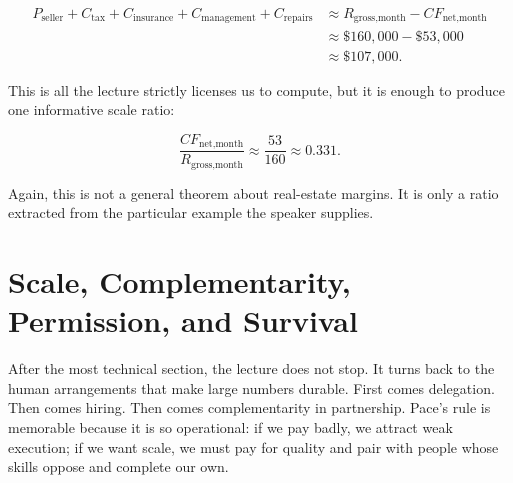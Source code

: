 \begin{align}
P_{\text{seller}}+C_{\text{tax}}+C_{\text{insurance}}+C_{\text{management}}+C_{\text{repairs}}
&\approx R_{\text{gross,month}}-CF_{\text{net,month}}\\
&\approx \$160{,}000-\$53{,}000\\
&\approx \$107{,}000.
\end{align}

This is all the lecture strictly licenses us to compute, but it is enough to produce one informative scale ratio:

\begin{equation}
\frac{CF_{\text{net,month}}}{R_{\text{gross,month}}}
\approx
\frac{53}{160}
\approx
0.331.
\end{equation}

Again, this is not a general theorem about real-estate margins. It is only a ratio extracted from the particular example the speaker supplies.

\begin{figure}
\centering
{}
\end{figure}

\section{Scale, Complementarity, Permission, and Survival}

After the most technical section, the lecture does not stop. It turns back to the human arrangements that make large numbers durable. First comes delegation. Then comes hiring. Then comes complementarity in partnership. Pace's rule is memorable because it is so operational: if we pay badly, we attract weak execution; if we want scale, we must pay for quality and pair with people whose skills oppose and complete our own.

